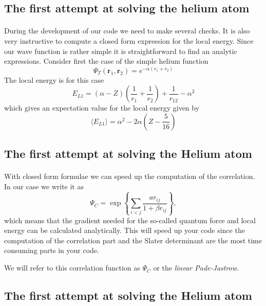 \documentclass[%
twoside,                 %
final,                   %
10pt]{article}
\begin{document}
\subsection{The first attempt at solving the helium atom}

\paragraph{}

During the development of our code we need to make several checks. It is also very instructive to compute a closed form expression for the local energy. Since our wave function is rather simple  it is straightforward
to find an analytic expressions.  Consider first the case of the simple helium function 
\[
   \Psi_T(\bm{r}_1,\bm{r}_2) = e^{-\alpha(r_1+r_2)}
\]
The local energy is for this case 
\[ 
E_{L1} = \left(\alpha-Z\right)\left(\frac{1}{r_1}+\frac{1}{r_2}\right)+\frac{1}{r_{12}}-\alpha^2
\]
which gives an expectation value for the local energy given by
\[
\langle E_{L1} \rangle = \alpha^2-2\alpha\left(Z-\frac{5}{16}\right)
\]



\subsection{The first attempt at solving the Helium atom}

\paragraph{}

With closed form formulae we  can speed up the computation of the correlation. In our case
we write it as 
\[
\Psi_C= \exp{\left\{\sum_{i < j}\frac{ar_{ij}}{1+\beta r_{ij}}\right\}},
\]
which means that the gradient needed for the so-called quantum force and local energy 
can be calculated analytically.
This will speed up your code since the computation of the correlation part and the Slater determinant are the most 
time consuming parts in your code.  

We will refer to this correlation function as $\Psi_C$ or the \emph{linear Pade-Jastrow}.



\subsection{The first attempt at solving the Helium atom}
\end{document}
